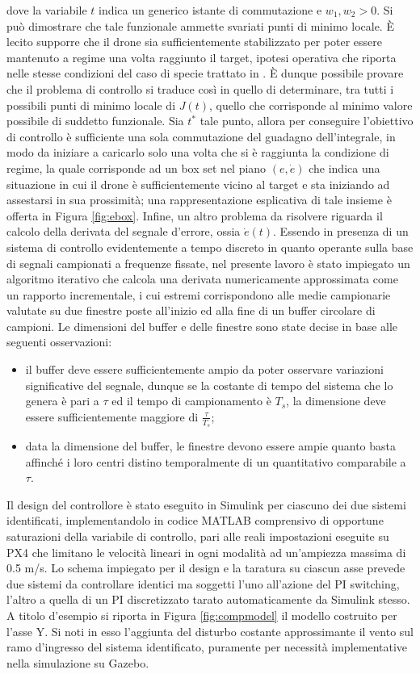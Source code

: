 dove la variabile $t$ indica un generico istante di commutazione e $w_1, w_2 > 0$. Si può dimostrare che tale funzionale ammette svariati punti di minimo locale. È lecito supporre che il drone sia sufficientemente stabilizzato per poter essere mantenuto a regime una volta raggiunto il target, ipotesi operativa che riporta nelle stesse condizioni del caso di specie trattato in \cite{pisw}. È dunque possibile provare che il problema di controllo si traduce così in quello di determinare, tra tutti i possibili punti di minimo locale di $J(t)$, quello che corrisponde al minimo valore possibile di suddetto funzionale. Sia $t^*$ tale punto, allora per conseguire l'obiettivo di controllo è sufficiente una sola commutazione del guadagno dell'integrale, in modo da iniziare a caricarlo solo una volta che si è raggiunta la condizione di regime, la quale corrisponde ad un box set nel piano $(e, \dot{e})$ che indica una situazione in cui il drone è sufficientemente vicino al target e sta iniziando ad assestarsi in sua prossimità; una rappresentazione esplicativa di tale insieme è offerta in Figura \ref{fig:ebox}. Infine, un altro problema da risolvere riguarda il calcolo della derivata del segnale d'errore, ossia $\dot{e}(t)$. Essendo in presenza di un sistema di controllo evidentemente a tempo discreto in quanto operante sulla base di segnali campionati a frequenze fissate, nel presente lavoro è stato impiegato un algoritmo iterativo che calcola una derivata numericamente approssimata come un rapporto incrementale, i cui estremi corrispondono alle medie campionarie valutate su due finestre poste all'inizio ed alla fine di un buffer circolare di campioni. Le dimensioni del buffer e delle finestre sono state decise in base alle seguenti osservazioni:
\begin{itemize}
    \item il buffer deve essere sufficientemente ampio da poter osservare variazioni significative del segnale, dunque se la costante di tempo del sistema che lo genera è pari a $\tau$ ed il tempo di campionamento è $T_s$, la dimensione deve essere sufficientemente maggiore di $\frac{\tau}{T_s}$;
    \item data la dimensione del buffer, le finestre devono essere ampie quanto basta affinché i loro centri distino temporalmente di un quantitativo comparabile a $\tau$.
\end{itemize}
Il design del controllore è stato eseguito in Simulink per ciascuno dei due sistemi identificati, implementandolo in codice MATLAB comprensivo di opportune saturazioni della variabile di controllo, pari alle reali impostazioni eseguite su PX4 che limitano le velocità lineari in ogni modalità ad un'ampiezza massima di 0.5 m/s. Lo schema impiegato per il design e la taratura su ciascun asse prevede due sistemi da controllare identici ma soggetti l'uno all'azione del PI switching, l'altro a quella di un PI discretizzato tarato automaticamente da Simulink stesso. A titolo d'esempio si riporta in Figura \ref{fig:compmodel} il modello costruito per l'asse Y. Si noti in esso l'aggiunta del disturbo costante approssimante il vento sul ramo d'ingresso del sistema identificato, puramente per necessità implementative nella simulazione su Gazebo.\\
